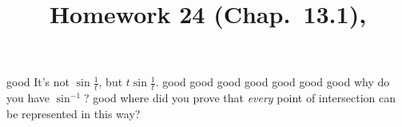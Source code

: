 \documentclass[10pt]{article} %
\title{Homework 24 (Chap.~13.1),
}
\begin{document}
\maketitle
{}
good
It's not $\sin\frac{1}{t}$, but $t\sin\frac{1}{t}$.
good
good
good
good
good
good
good
why do you have $\sin^{-1}$?
good
where did you prove that \textit{every} point of intersection can be represented in this way?
\end{document}

